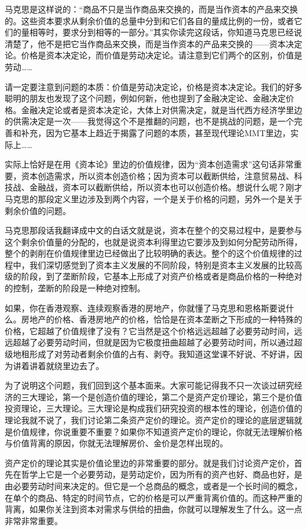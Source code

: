 \documentclass[UTF8, 12pt, a4paper]{ctexrep}
\begin{document}
马克思是这样说的：“商品不只是当作商品来交换的，而是当作资本的产品来交换的。这些资本要求从剩余价值的总量中分到和它们各自的量成比例的一份，或者它们的量相等时，要求分到相等的一部分。”其实你读完这段话，你知道马克思已经说清楚了，他不是把它当作商品来交换，而是当作资本的产品来交换的——资本决定论。价格是资本决定论，而价值是劳动决定论。请注意到它们两个的区别，价值是劳动……

请一定要注意到问题的本质：价值是劳动决定论，价格是资本决定论。我们的好多聪明的朋友也发现了这个问题，例如何新，他也提到了金融决定论、金融决定价格。金融决定论或者是资本决定论，大体上对供需决定，就是当代西方经济学里边的供需决定是一次——我觉得这个不是推翻的问题，也不是挑战的问题，是一个完善和补充，因为它基本上趋近于揭露了问题的本质，甚至现代理论MMT里边，实际上……

实际上恰好是在用《资本论》里边的价值规律，因为“资本创造需求”这句话非常重要，资本创造需求，所以资本创造价格；因为资本可以截断供给，注意贸易战、科技战、金融战，资本可以截断供给，所以资本也可以创造价格。想说什么呢？刚才马克思的那段定义里边涉及到两个内容，一个是关于价格的问题，另外一个是关于剩余价值的问题。

马克思那段话我翻译成中文的白话文就是说，资本在整个的交易过程中，是要参与这个剩余价值量的分配的，也就是说资本利得里边它要涉及到如何分配劳动所得，整个的剥削在价值规律里边已经做出了比较明确的表达。整个的这个价值规律的过程中，我们深切感觉到了资本主义发展的不同阶段，特别是资本主义发展的比较高级的阶段，到了垄断阶段，它基本上形成了对资产价格或者是商品价格的一种绝对的控制，垄断的阶段是一种绝对控制。

如果，你在香港观察、连续观察香港的房地产，你就懂了马克思和恩格斯要说什么。房地产的价格、香港房地产的价格，恰恰是在资本垄断之下形成的一种特殊的价格，它超越了价值规律了没有？它当然是这个价格远远超越了必要劳动时间，远远超越了必要劳动时间，但就是因为它极度扭曲超越了必要劳动时间，所以通过超级地租形成了对劳动者剩余价值的占有、剥夺。我知道这堂课不好说、不好讲，因为讲着讲着就绕里边去了。

为了说明这个问题，我们回到这个基本面来。大家可能记得我不只一次谈过研究经济的三大理论，第一个是创造价值的理论，第二个是资产定价理论，第三个是价值投资理论，三大理论。三大理论是构成我们研究投资的根本性的理论，创造价值的理论我就不说了，我们讨论第二条资产定价的理论。资产定价的理论的底层逻辑就是价值规律，你说重要不重要？如果你不知道资产定价的理论，你就无法理解价格与价值背离的原因，你就无法理解房价、金价是怎样出现的。

资产定价的理论其实是价值论里边的非常重要的部分。就是我们讨论资产定价，首先在哲学上它是一个必要劳动，是劳动定价，因为所有的资产也好、商品也好，是由必要劳动时间来决定的。但它是一个总商品的概念，或者是一个长时间的概念，在单个的商品、特定的时间节点，它的价格是可以严重背离价值的。而这种严重的背离，如果你关注到资本对需求与供给的扭曲，你就可以理解发生了什么。这一点非常非常重要。
\end{document}
